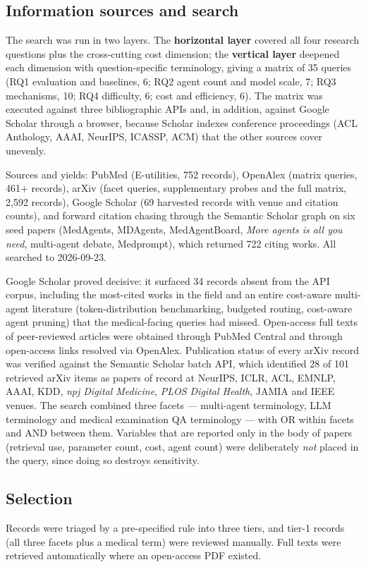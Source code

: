 \documentclass[11pt,a4paper]{article}
\begin{document}
\subsection{Information sources and search}
The search was run in two layers. The \textbf{horizontal layer} covered all four research
questions plus the cross-cutting cost dimension; the \textbf{vertical layer} deepened each
dimension with question-specific terminology, giving a matrix of 35 queries
(RQ1 evaluation and baselines, 6; RQ2 agent count and model scale, 7; RQ3 mechanisms, 10;
RQ4 difficulty, 6; cost and efficiency, 6). The matrix was executed against three
bibliographic APIs and, in addition, against Google Scholar through a browser, because
Scholar indexes conference proceedings (ACL Anthology, AAAI, NeurIPS, ICASSP, ACM) that the
other sources cover unevenly.

Sources and yields: PubMed (E-utilities, 752 records), OpenAlex (matrix queries, 461+
records), arXiv (facet queries, supplementary probes and the full matrix, 2{,}592 records),
Google Scholar (69 harvested records with venue and citation counts), and forward citation
chasing through the Semantic Scholar graph on six seed papers (MedAgents, MDAgents,
MedAgentBoard, \emph{More agents is all you need}, multi-agent debate, Medprompt), which
returned 722 citing works. All searched to 2026-09-23.

Google Scholar proved decisive: it surfaced 34 records absent from the API corpus,
including the most-cited works in the field and an entire cost-aware multi-agent literature
(token-distribution benchmarking, budgeted routing, cost-aware agent pruning) that the
medical-facing queries had missed. Open-access full texts of peer-reviewed articles were obtained through
PubMed Central and through open-access links resolved via OpenAlex.
Publication status of every arXiv record was verified against the Semantic Scholar
batch API, which identified 28 of 101 retrieved arXiv items as papers of record at
NeurIPS, ICLR, ACL, EMNLP, AAAI, KDD, \emph{npj Digital Medicine}, \emph{PLOS Digital
Health}, JAMIA and IEEE venues. The search combined three facets --- multi-agent
terminology, LLM terminology and medical examination QA terminology --- with OR within
facets and AND between them. Variables that are reported only in the body of papers
(retrieval use, parameter count, cost, agent count) were deliberately \emph{not} placed in
the query, since doing so destroys sensitivity.

\subsection{Selection}
Records were triaged by a pre-specified rule into three tiers, and tier-1 records
(all three facets plus a medical term) were reviewed manually. Full texts were retrieved
automatically where an open-access PDF existed.
\end{document}
